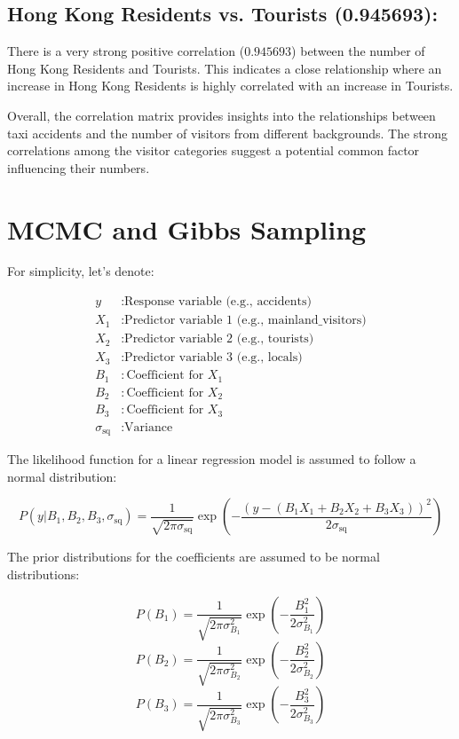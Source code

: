 \documentclass{article}
\begin{document}
\subsection*{Hong Kong Residents vs. Tourists (0.945693):}

There is a very strong positive correlation ($0.945693$) between the number of Hong Kong Residents and Tourists. This indicates a close relationship where an increase in Hong Kong Residents is highly correlated with an increase in Tourists.

Overall, the correlation matrix provides insights into the relationships between taxi accidents and the number of visitors from different backgrounds. The strong correlations among the visitor categories suggest a potential common factor influencing their numbers. 
\newpage
\section{MCMC and Gibbs Sampling}

For simplicity, let's denote:

\begin{align*}
y & : \text{Response variable (e.g., accidents)} \\
X_1 & : \text{Predictor variable 1 (e.g., mainland\_visitors)} \\
X_2 & : \text{Predictor variable 2 (e.g., tourists)} \\
X_3 & : \text{Predictor variable 3 (e.g., locals)} \\
B_1 & : \text{Coefficient for } X_1 \\
B_2 & : \text{Coefficient for } X_2 \\
B_3 & : \text{Coefficient for } X_3 \\
\sigma_{\text{sq}} & : \text{Variance}
\end{align*}

The likelihood function for a linear regression model is assumed to follow a normal distribution:

\[
P(y | B_1, B_2, B_3, \sigma_{\text{sq}}) = \frac{1}{\sqrt{2\pi\sigma_{\text{sq}}}} \exp\left(-\frac{(y - (B_1X_1 + B_2X_2 + B_3X_3))^2}{2\sigma_{\text{sq}}}\right)
\]

The prior distributions for the coefficients are assumed to be normal distributions:

\[
P(B_1) = \frac{1}{\sqrt{2\pi\sigma_{B_1}^2}} \exp\left(-\frac{B_1^2}{2\sigma_{B_1}^2}\right)
\]
\[
P(B_2) = \frac{1}{\sqrt{2\pi\sigma_{B_2}^2}} \exp\left(-\frac{B_2^2}{2\sigma_{B_2}^2}\right)
\]
\[
P(B_3) = \frac{1}{\sqrt{2\pi\sigma_{B_3}^2}} \exp\left(-\frac{B_3^2}{2\sigma_{B_3}^2}\right)
\]
\end{document}
